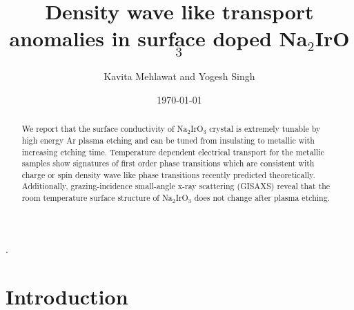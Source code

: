 \documentclass[aps,prb,twocolumn]{revtex4-1}
\begin{document}
\title{ Density wave like transport anomalies in surface doped Na$_{2}$IrO$_3$}.
\author{Kavita Mehlawat and Yogesh Singh}

\date{\today}

\begin{abstract}
We report that the surface conductivity of Na$_{2}$IrO$_3$ crystal is extremely tunable by high energy Ar plasma etching and can be tuned from insulating to metallic with increasing etching time. Temperature dependent electrical transport for the metallic samples show signatures of first order phase transitions which are consistent with charge or spin density wave like phase transitions recently predicted theoretically. Additionally, grazing-incidence small-angle x-ray scattering (GISAXS) reveal that the room temperature surface structure of Na$_{2}$IrO$_3$ does not change after plasma etching.

\end{abstract}

\maketitle

\section{Introduction}
\label{sec:INTRO}
\end{document}
